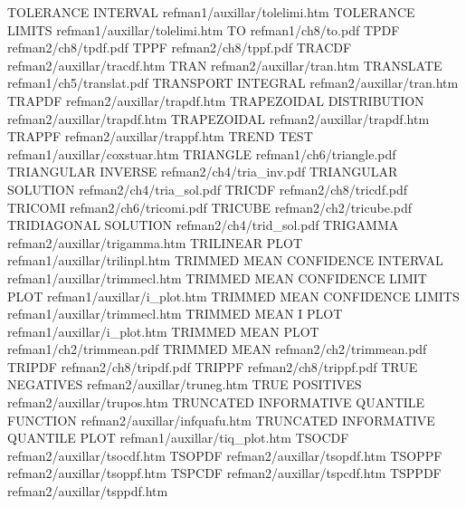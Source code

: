 TOLERANCE INTERVAL                      refman1/auxillar/tolelimi.htm
TOLERANCE LIMITS                        refman1/auxillar/tolelimi.htm
TO                                      refman1/ch8/to.pdf
TPDF                                    refman2/ch8/tpdf.pdf
TPPF                                    refman2/ch8/tppf.pdf
TRACDF                                  refman2/auxillar/tracdf.htm
TRAN                                    refman2/auxillar/tran.htm
TRANSLATE                               refman1/ch5/translat.pdf
TRANSPORT INTEGRAL                      refman2/auxillar/tran.htm
TRAPDF                                  refman2/auxillar/trapdf.htm
TRAPEZOIDAL DISTRIBUTION                refman2/auxillar/trapdf.htm
TRAPEZOIDAL                             refman2/auxillar/trapdf.htm
TRAPPF                                  refman2/auxillar/trappf.htm
TREND TEST                              refman1/auxillar/coxstuar.htm
TRIANGLE                                refman1/ch6/triangle.pdf
TRIANGULAR INVERSE                      refman2/ch4/tria_inv.pdf
TRIANGULAR SOLUTION                     refman2/ch4/tria_sol.pdf
TRICDF                                  refman2/ch8/tricdf.pdf
TRICOMI                                 refman2/ch6/tricomi.pdf
TRICUBE                                 refman2/ch2/tricube.pdf
TRIDIAGONAL SOLUTION                    refman2/ch4/trid_sol.pdf
TRIGAMMA                                refman2/auxillar/trigamma.htm
TRILINEAR PLOT                          refman1/auxillar/trilinpl.htm
TRIMMED MEAN CONFIDENCE INTERVAL        refman1/auxillar/trimmecl.htm
TRIMMED MEAN CONFIDENCE LIMIT PLOT      refman1/auxillar/i_plot.htm
TRIMMED MEAN CONFIDENCE LIMITS          refman1/auxillar/trimmecl.htm
TRIMMED MEAN I PLOT                     refman1/auxillar/i_plot.htm
TRIMMED MEAN PLOT                       refman1/ch2/trimmean.pdf
TRIMMED MEAN                            refman2/ch2/trimmean.pdf
TRIPDF                                  refman2/ch8/tripdf.pdf
TRIPPF                                  refman2/ch8/trippf.pdf
TRUE NEGATIVES                          refman2/auxillar/truneg.htm
TRUE POSITIVES                          refman2/auxillar/trupos.htm
TRUNCATED INFORMATIVE QUANTILE FUNCTION refman2/auxillar/infquafu.htm
TRUNCATED INFORMATIVE QUANTILE PLOT     refman1/auxillar/tiq_plot.htm
TSOCDF                                  refman2/auxillar/tsocdf.htm
TSOPDF                                  refman2/auxillar/tsopdf.htm
TSOPPF                                  refman2/auxillar/tsoppf.htm
TSPCDF                                  refman2/auxillar/tspcdf.htm
TSPPDF                                  refman2/auxillar/tsppdf.htm
